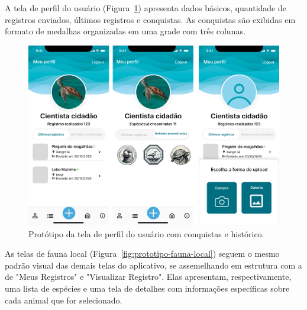 A tela de perfil do usuário (Figura~\ref{fig:prototipo-perfil}) apresenta dados básicos, 
quantidade de registros enviados, últimos registros e conquistas. As conquistas são exibidas 
em formato de medalhas organizadas em uma grade com três colunas.

\begin{figure}[H]
    \centering
    \includegraphics[height=0.53\textheight, width=\textwidth]{imagens/perfil-figma.png}
    \caption{Protótipo da tela de perfil do usuário com conquistas e histórico.}
    \label{fig:prototipo-perfil}
\end{figure}

As telas de fauna local (Figura~\ref{fig:prototipo-fauna-local}) seguem o mesmo padrão visual 
das demais telas do aplicativo, se assemelhando em estrutura com a de "Meus Registros" e 
"Visualizar Registro". Elas apresentam, respectivamente, uma lista de espécies e uma 
tela de detalhes com informações específicas sobre cada animal que for selecionado.

